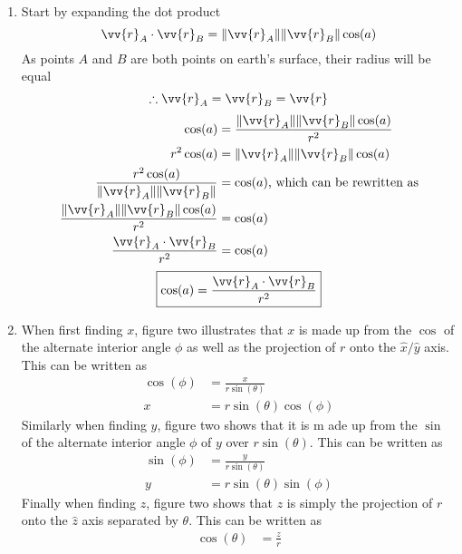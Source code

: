 \documentclass{article}
\begin{document}
\begin{enumerate}[label=(\alph*)]
    \item Start by expanding the dot product
        $$ \vv{r}_A \cdot \vv{r}_B = \|\vv{r}_A\|\|\vv{r}_B\|\cos(a) $$
        As points $ A $ and $ B $ are both points on earth's surface, their radius will be equal
        $$ \therefore \vv{r}_A = \vv{r}_B = \vv{r} $$
        \begin{align*}
            \cos(a) & = \frac{\|\vv{r}_A\|\|\vv{r}_B\|\cos(a)}{r^2} \\
            r^2\cos(a) & = \|\vv{r}_A\|\|\vv{r}_B\|\cos(a) \\
            \frac{r^2\cos(a)}{\|\vv{r}_A\|\|\vv{r}_B\|} & = \cos(a) \text{, which can be rewritten as} \\
            \frac{\|\vv{r}_A\|\|\vv{r}_B\|\cos(a)}{r^2} & = \cos(a) \\
            \frac{\vv{r}_A \cdot \vv{r}_B}{r^2} & = \cos(a) \\
        \end{align*}
        \begin{equation*}
            \boxed{
                \cos(a) = \frac{\vv{r}_A \cdot \vv{r}_B}{r^2}
            }
        \end{equation*}
    \item
        When first finding $ x $, figure two illustrates that $ x $ is made up from the $ \cos $ of the alternate interior angle $ \phi $ as well as the projection of $ r $ onto the $ \hat{x}/\hat{y} $ axis. This can be written as
        \begin{align*}
            \cos(\phi) & = \frac{x}{r\sin(\theta)} \\
            x & = r\sin(\theta)\cos(\phi)
        \end{align*}
        Similarly when finding $ y $, figure two shows that it is m ade up from the $ \sin $ of the alternate interior angle $ \phi $ of $ y $ over $ r\sin(\theta) $. This can be written as
        \begin{align*}
            \sin(\phi) & = \frac{y}{r\sin(\theta)} \\
            y & = r\sin(\theta)\sin(\phi)
        \end{align*}
        Finally when finding $ z $, figure two shows that $ z $ is simply the projection of $ r $ onto the $ \hat{z} $ axis separated by $ \theta $. This can be written as
        \begin{align*}
            \cos(\theta) & = \frac{z}{r} \\

\end{align*}
\end{enumerate}
\end{document}
